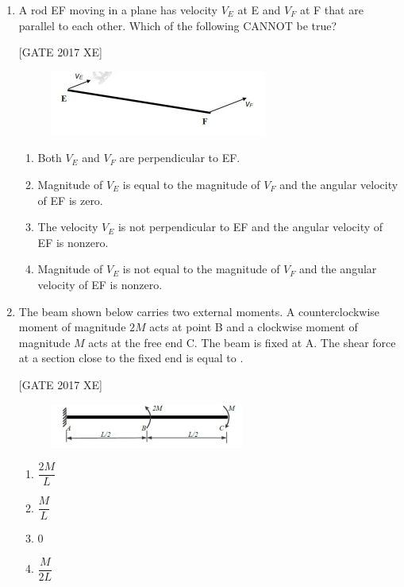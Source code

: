 \documentclass[journal,12pt,onecolumn]{IEEEtran}
\theoremstyle{remark}
\begin{document}
\begin{enumerate}
\item A rod EF moving in a plane has velocity $V_E$ at E and $V_F$ at F that are parallel to each other. Which of the following CANNOT be true?  

\hfill [GATE 2017 XE]

\begin{figure}[H]
    \centering
    \includegraphics[width=0.5\linewidth]{figs/fig12.png}
    \caption{}
    \label{fig:fig12}
\end{figure}

\begin{multicols}{2}
\begin{enumerate}
    \item Both $V_E$ and $V_F$ are perpendicular to EF.  
    \item Magnitude of $V_E$ is equal to the magnitude of $V_F$ and the angular velocity of EF is zero.  
    \item The velocity $V_E$ is not perpendicular to EF and the angular velocity of EF is nonzero.  
    \item Magnitude of $V_E$ is not equal to the magnitude of $V_F$ and the angular velocity of EF is nonzero.  
\end{enumerate}
\end{multicols}

\item The beam shown below carries two external moments. A counterclockwise moment of magnitude $2M$ acts at point B and a clockwise moment of magnitude $M$ acts at the free end C. The beam is fixed at A. The shear force at a section close to the fixed end is equal to \underline{\hspace{2cm}}.  

\hfill [GATE 2017 XE]

\begin{figure}[H]
    \centering
    \includegraphics[width=0.5\linewidth]{figs/fig13.png}
    \caption{}
    \label{fig:fig13}
\end{figure}

\begin{multicols}{2}
\begin{enumerate}
    \item $\dfrac{2M}{L}$  
    \item $\dfrac{M}{L}$  
    \item $0$  
    \item $\dfrac{M}{2L}$  
\end{enumerate}
\end{multicols}


\end{enumerate}
\end{document}
